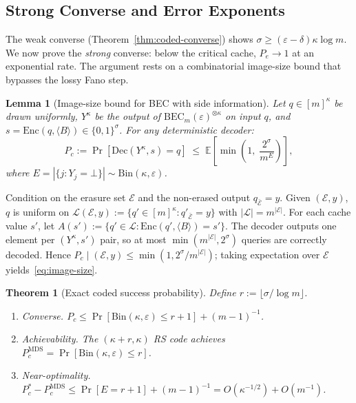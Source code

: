 \documentclass[journal]{IEEEtran}
\makeatletter
\newtheorem{theorem}{Theorem}[section]
\newtheorem{lemma}{Lemma}[section]
\numberwithin{equation}{section}
\renewenvironment{proof}[1][\proofname]{\par
  \pushQED{\qed}%
  \normalfont \topsep6\p@\@plus6\p@\relax
  \trivlist
  \item[\hskip\labelsep
        \itshape
    #1\@addpunct{.}]\ignorespaces
}{%
  \popQED\endtrivlist\@endpefalse
}
\makeatother
\begin{document}
\subsection{Strong Converse and Error Exponents}
\label{subsec:exact-strong-converse}

The weak converse (Theorem~\ref{thm:coded-converse}) shows
$\sigma\ge(\varepsilon{-}\delta)\kappa\log m$.
We now prove the \emph{strong} converse: below the critical
cache, $P_e\to 1$ at an exponential rate.
The argument rests on a combinatorial image-size bound that
bypasses the lossy Fano step.

\begin{lemma}[Image-size bound for BEC with side information]
\label{lem:image-size}
Let $q\in[m]^\kappa$ be drawn uniformly,
$Y^\kappa$ be the output of
$\mathrm{BEC}_m(\varepsilon)^{\otimes\kappa}$ on input $q$,
and $s=\mathrm{Enc}(q,\langle B\rangle)\in\{0,1\}^\sigma$.
For any deterministic decoder:
\begin{equation}\label{eq:image-size}
  P_c
  :=\Pr[\mathrm{Dec}(Y^\kappa,s)=q]
  \;\le\;
  \mathbb{E}\!\left[\min\!\left(1,\;
    \frac{2^\sigma}{m^E}\right)\right],
\end{equation}
where $E=|\{j:Y_j=\bot\}|
\sim\mathrm{Bin}(\kappa,\varepsilon)$.
\end{lemma}

\begin{proof}
Condition on the erasure set $\mathcal E$ and the non-erased
output $q_{\bar{\mathcal E}}=y$.
Given $(\mathcal E,y)$, $q$ is uniform on
$\mathcal L(\mathcal E,y)
:=\{q'\in[m]^\kappa:q'_{\bar{\mathcal E}}=y\}$
with $|\mathcal L|=m^{|\mathcal E|}$.
For each cache value $s'$, let
$A(s'):=\{q'\in\mathcal L:\mathrm{Enc}(q',\langle B\rangle)=s'\}$.
The decoder outputs one element per $(Y^\kappa,s')$ pair,
so at most $\min(m^{|\mathcal E|},2^\sigma)$ queries are
correctly decoded.
Hence
$P_c\mid(\mathcal E,y)
\le\min(1,2^\sigma/m^{|\mathcal E|})$;
taking expectation over $\mathcal E$
yields~\eqref{eq:image-size}.
\end{proof}

\begin{theorem}[Exact coded success probability]
\label{thm:exact-Pc}
Define $r:=\lfloor\sigma/\log m\rfloor$.
\begin{enumerate}[label=\textup{(\roman*)}]
\item \emph{Converse.}\;
$P_c\le\Pr[\mathrm{Bin}(\kappa,\varepsilon)\le r{+}1]
  +(m{-}1)^{-1}$.
\item \emph{Achievability.}\;
The $(\kappa{+}r,\kappa)$ RS code achieves
$P_c^{\mathrm{MDS}}=\Pr[\mathrm{Bin}(\kappa,\varepsilon)\le r]$.
\item \emph{Near-optimality.}\;
$P_c^*-P_c^{\mathrm{MDS}}
  \le\Pr[E{=}r{+}1]+(m{-}1)^{-1}
  =O(\kappa^{-1/2})+O(m^{-1})$.
\end{enumerate}
\end{theorem}
\end{document}

